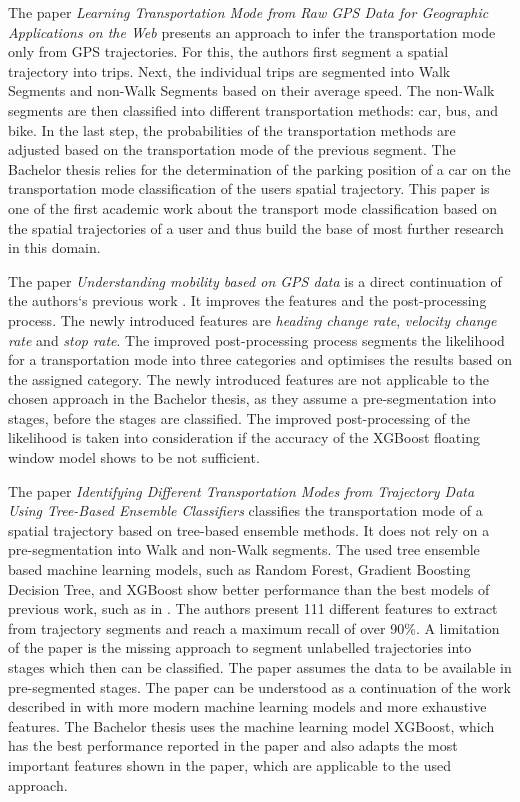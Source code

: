 The paper \textit{Learning Transportation Mode from Raw GPS Data for Geographic Applications on the Web} \cite{Zheng2008} presents an approach to infer the transportation mode only from GPS trajectories. For this, the authors first segment a spatial trajectory into trips. Next, the individual trips are segmented into Walk Segments and non-Walk Segments based on their average speed. The non-Walk segments are then classified into different transportation methods: car, bus, and bike. In the last step, the probabilities of the transportation methods are adjusted based on the transportation mode of the previous segment. \newline
The Bachelor thesis relies for the determination of the parking position of a car on the transportation mode classification of the users spatial trajectory. This paper is one of the first academic work about the transport mode classification based on the spatial trajectories of a user and thus build the base of most further research in this domain.

The paper \textit{Understanding mobility based on GPS data} \cite{zheng2008understanding} is a direct continuation of the authors`s previous work \cite{Zheng2008}. It improves the features and the post-processing process. The newly introduced features are \textit{heading change rate}, \textit{velocity change rate} and \textit{stop rate}. The improved post-processing process segments the likelihood for a transportation mode into three categories and optimises the results based on the assigned category. \newline
The newly introduced features are not applicable to the chosen approach in the Bachelor thesis, as they assume a pre-segmentation into stages, before the stages are classified. The improved post-processing of the likelihood is taken into consideration if the accuracy of the XGBoost floating window model shows to be not sufficient. 

The paper \textit{Identifying Different Transportation Modes from Trajectory Data Using Tree-Based Ensemble Classifiers} \cite{Xiao2017} classifies the transportation mode of a spatial trajectory based on tree-based ensemble methods. It does not rely on a pre-segmentation into Walk and non-Walk segments. The used tree ensemble based machine learning models, such as Random Forest, Gradient Boosting Decision Tree, and XGBoost show better performance than the best models of previous work, such as in \cite{Zheng2008}. The authors present 111 different features to extract from trajectory segments and reach a maximum recall of over 90\%. A limitation of the paper is the missing approach to segment unlabelled trajectories into stages which then can be classified. The paper assumes the data to be available in pre-segmented stages.\newline
The paper can be understood as a continuation of the work described in \cite{Zheng2008} with more modern machine learning models and more exhaustive features. The Bachelor thesis uses the machine learning model XGBoost, which has the best performance reported in the paper and also adapts the most important features shown in the paper, which are applicable to the used approach. \cite{chen2016xgboost}

